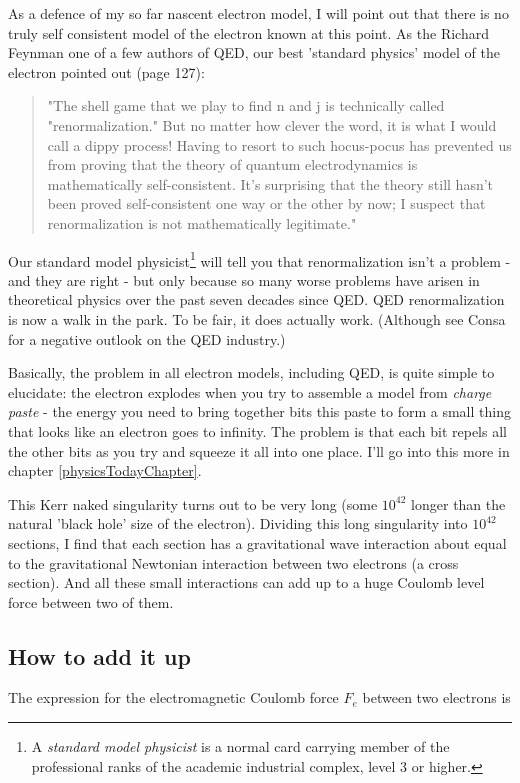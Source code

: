 \documentclass[../rzero]{subfiles}
\begin{document}
As a defence of my so far nascent electron model, I will point out that there is no truly self consistent model of the electron known at this point. As the Richard Feynman one of a few authors of QED, our best 'standard physics' model of the electron pointed out\cite{Feynman1985} (page 127): 

\begin{quotation}
"The shell game that we play to find n and j is technically called "renormalization." But no matter how clever the word, it is what I would call a dippy process! Having to resort to such hocus-pocus has prevented us from proving that the theory of quantum electrodynamics is mathematically self-consistent. It's surprising that the theory still hasn't been proved self-consistent one way or the other by now; I suspect that renormalization is not mathematically legitimate." 
\end{quotation}

Our standard model physicist\footnote{A \textit{standard model physicist} is a normal card carrying member of the professional ranks of the academic industrial complex, level 3 or higher.} will tell you that renormalization isn't a problem - and they are right - but only because so many worse problems have arisen in theoretical physics over the past seven decades since QED\cite{feynmanSpaceTimeApproachQuantum1949}. QED renormalization is now a walk in the park. To be fair, it does actually work. (Although see Consa\cite{Cioletti2006} for a negative outlook on the QED industry.)

Basically, the problem in all electron models, including QED, is quite simple to elucidate: the electron explodes when you try to assemble a model from \textit{charge paste} - the energy you need to bring together bits this paste to form a small thing that looks like an electron goes to infinity. The problem is that each bit repels all the other bits as you try and squeeze it all into one place. I'll go into this more in chapter \ref{physicsTodayChapter}.  

This Kerr naked singularity turns out to be very long (some $10^{42}$ longer than the natural 'black hole' size of the electron). Dividing this long singularity into  $10^{42}$ sections, I find that each section has a gravitational wave interaction about equal to the gravitational Newtonian interaction between two electrons (a cross section). And all these small interactions can add up to a huge Coulomb level force between two of them.  

\subsection{How to add it up}
The expression for the electromagnetic Coulomb force $F_e$ between two electrons is 
\end{document}
